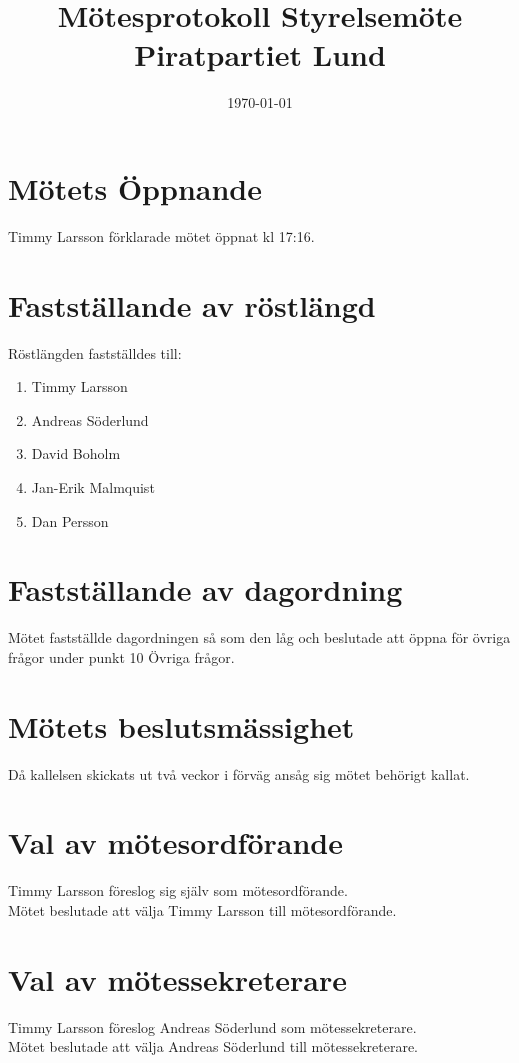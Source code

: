 \documentclass[a4paper,10pt]{article}
\title{\vspace{-1.5in}\textmd{\textbf{Mötesprotokoll Styrelsemöte Piratpartiet Lund}}}
\date{\today}
\author{}
\begin{document}
\maketitle

\section{Mötets Öppnande}
Timmy Larsson förklarade mötet öppnat kl 17:16.

\section{Fastställande av röstlängd}
Röstlängden fastställdes till:
\begin{enumerate}
\item Timmy Larsson
\item Andreas Söderlund
\item David Boholm
\item Jan-Erik Malmquist
\item Dan Persson
\end{enumerate}

\section{Fastställande av dagordning}
Mötet fastställde dagordningen så som den låg och beslutade att öppna för övriga frågor under punkt 10 Övriga frågor.

\section{Mötets beslutsmässighet}
Då kallelsen skickats ut två veckor i förväg ansåg sig mötet behörigt kallat.

\newpage

\section{Val av mötesordförande}
Timmy Larsson föreslog sig själv som mötesordförande. \\
Mötet beslutade att välja Timmy Larsson till mötesordförande.

\section{Val av mötessekreterare}
Timmy Larsson föreslog Andreas Söderlund som mötessekreterare. \\
Mötet beslutade att välja Andreas Söderlund till mötessekreterare.
\end{document}
